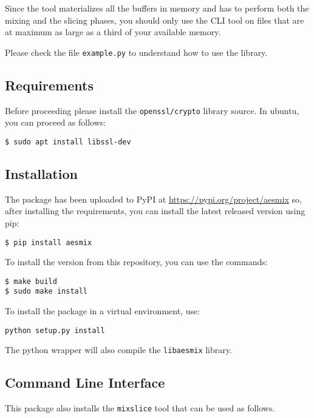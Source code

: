 Since the tool materializes all the buffers in memory and has to perform
both the mixing and the slicing phases, you should only use the CLI tool
on files that are at maximum as large as a third of your available
memory.

Please check the file \texttt{example.py} to understand how to use the
library.

\subsection{Requirements}\label{requirements}

Before proceeding please install the \texttt{openssl/crypto} library
source. In ubuntu, you can proceed as follows:

\begin{verbatim}
$ sudo apt install libssl-dev
\end{verbatim}

\subsection{Installation}\label{installation}

The package has been uploaded to PyPI at \url{https://pypi.org/project/aesmix} so, after installing the requirements, you can install the latest released version using pip:

\begin{verbatim}
$ pip install aesmix
\end{verbatim}

To install the version from this repository, you can use the commands:

\begin{verbatim}
$ make build
$ sudo make install
\end{verbatim}

To install the package in a virtual environment, use:

\begin{verbatim}
python setup.py install
\end{verbatim}

The python wrapper will also compile the \texttt{libaesmix} library.

\subsection{Command Line Interface}\label{command-line-interface}

This package also installs the \texttt{mixslice} tool that can be used
as follows.

